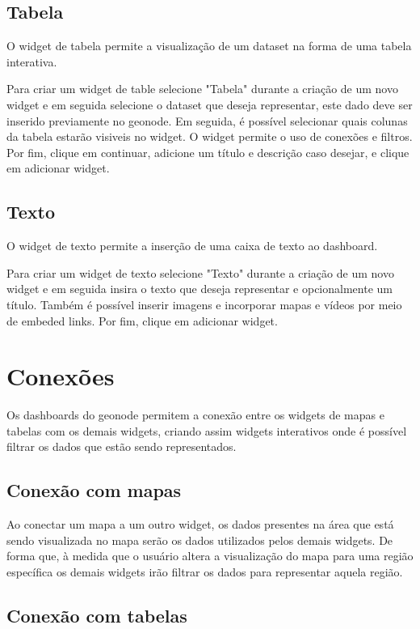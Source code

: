 \documentclass[a4paper,12pt]{article}
\begin{document}
\subsection{Tabela}
  
  O widget de tabela permite a visualização de um dataset na forma de uma
  tabela interativa.
  
  Para criar um widget de table selecione "Tabela" durante a criação de um novo
  widget e em seguida selecione o dataset que deseja representar, este dado
  deve ser inserido previamente no geonode. Em seguida, é possível selecionar
  quais colunas da tabela estarão visiveis no widget. O widget permite o uso de
  conexões e filtros. Por fim, clique em continuar, adicione um título e
  descrição caso desejar, e clique em adicionar widget.

\subsection{Texto}
  O widget de texto permite a inserção de uma caixa de texto ao dashboard.

  Para criar um widget de texto selecione "Texto" durante a criação de um novo
  widget e em seguida insira o texto que deseja representar e opcionalmente um
  título. Também é possível inserir imagens e incorporar mapas e vídeos por
  meio de embeded links. Por fim, clique em adicionar widget.

\section{Conexões}

Os dashboards do geonode permitem a conexão entre os widgets de mapas e tabelas
com os demais widgets, criando assim widgets interativos onde é possível
filtrar os dados que estão sendo representados.

\subsection{Conexão com mapas}

  Ao conectar um mapa a um outro widget, os dados presentes na área que está
  sendo visualizada no mapa serão os dados utilizados pelos demais widgets. De
  forma que, à medida que o usuário altera a visualização do mapa para uma
  região específica os demais widgets irão filtrar os dados para representar
  aquela região.

\subsection{Conexão com tabelas}
\end{document}
